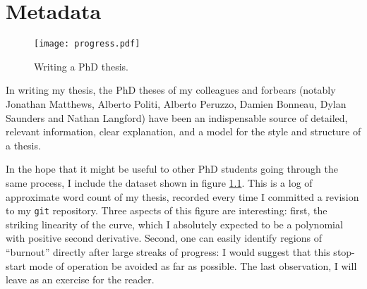 \chapter{Metadata}
\label{app:metadata}

\begin{figure}[t]
\begin{center}
\texttt{[image: progress.pdf]}
\end{center}
\caption[Metadata]{Writing a PhD thesis. }
\label{fig:metadata}
\end{figure}

In writing my thesis, the PhD theses of my colleagues and forbears (notably Jonathan Matthews, Alberto Politi, Alberto Peruzzo, Damien Bonneau, Dylan Saunders and Nathan Langford) have been an indispensable source of detailed, relevant information, clear explanation, and a model for the style and structure of a thesis. 

In the hope that it might be useful to other PhD students going through the same process, I include the dataset shown in figure \ref{fig:metadata}. This is a log of approximate word count of my thesis, recorded every time I committed a revision to my \texttt{git} repository. Three aspects of this figure are interesting: first, the striking linearity of the curve, which I absolutely expected to be a polynomial with positive second derivative. Second, one can easily identify regions of ``burnout'' directly after large streaks of progress: I would suggest that this stop-start mode of operation be avoided as far as possible. The last observation, I will leave as an exercise for the reader.


